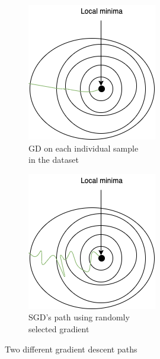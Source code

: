 \begin{figure}[h]
\centering
\begin{subfigure}{0.4\textwidth}
\centering
\includegraphics[scale=0.4]{latex/imgs/GDsmooth.png}
\caption{GD on each individual sample\\  in the dataset}
\end{subfigure}
\begin{subfigure}{0.4\textwidth}
\centering
\includegraphics[scale=0.4]{latex/imgs/SGDpath.png}
\caption{SGD's path using randomly \\ selected gradient}
\end{subfigure}
\caption{Two different gradient descent paths}
\label{fig:image2}
\end{figure}
